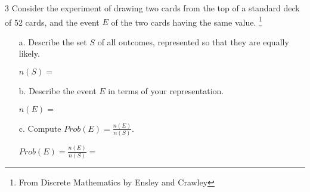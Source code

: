 \documentclass[a4paper,12pt]{book}
\newcounter{question}
\begin{document}
        \begin{question}{\thequestion}{3}
            Consider the experiment of drawing two cards from the top of
            a standard deck of 52 cards, and the event $E$ of the two cards
            having the same value.
            \footnote{From Discrete Mathematics by Ensley and Crawley}

            \begin{enumerate}
                \item[a.] Describe the set $S$ of all outcomes,
                    represented so that they are equally likely.


                    $n(S) = $ 

                \item[b.] Describe the event $E$ in terms of your representation.


                    $n(E) = $ 

                \item[c.] Compute $Prob(E) = \frac{n(E)}{n(S)}$.

                    $Prob(E) = \frac{n(E)}{n(S)} =$
            \end{enumerate}

        \end{question}
\end{document}
